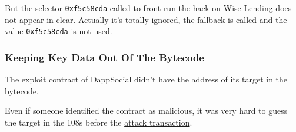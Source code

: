 But the selector \lstinline{0xf5c58cda} called to \href{\urltxmevhack}{front-run the hack on Wise Lending} does not appear in clear.
Actually it's totally ignored, the fallback is called and the value \lstinline{0xf5c58cda} is not used.

\subsubsection{Keeping Key Data Out Of The Bytecode}

The exploit contract of DappSocial didn't have the address of its target in the bytecode.

Even if someone identified the contract as malicious, it was very hard to guess the target in the 108s before the \href{\urltxdappsocialexploit}{attack transaction}.
